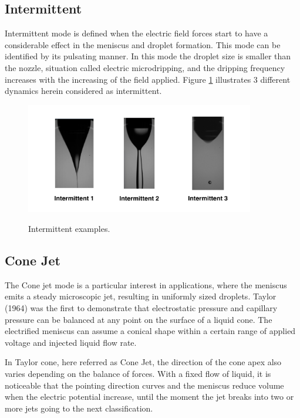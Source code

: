 \subsection{Intermittent}
\label{subsec:Intermittent}

Intermittent mode is defined when the electric field forces start to have a considerable effect in the meniscus and droplet formation. 
This mode can be identified by its pulsating manner.
In this mode the droplet size is smaller than the nozzle, situation called electric microdripping, and the dripping frequency increases with the increasing of the field applied.
Figure \ref{fig:intermittent_example} illustrates 3 different dynamics herein considered as intermittent.


  \begin{figure}[H]
      \center
      \includegraphics[width=10cm]{Figuras/19:03/intermittent_example.png}
      \label{fig:intermittent_example}
      \caption{Intermittent examples.}
  \end{figure}


\subsection{Cone Jet}
\label{subsec:Cone Jet}

The Cone jet mode is a particular interest in applications, where the meniscus emits a steady microscopic jet, resulting in uniformly sized droplets. 
Taylor (1964)\cite{taylor} was the first to demonstrate that electrostatic pressure and capillary pressure can be balanced at any point on the surface of a liquid cone.
The electrified meniscus can assume a conical shape within a certain range of applied voltage and injected liquid flow rate. 

In Taylor cone, here referred as Cone Jet, the direction of the cone apex also varies depending on the balance of forces. 
With a fixed flow of liquid, it is noticeable that the pointing direction curves and the meniscus reduce volume when the electric potential increase, until the moment the jet breaks into two or more jets going to the next classification. 

